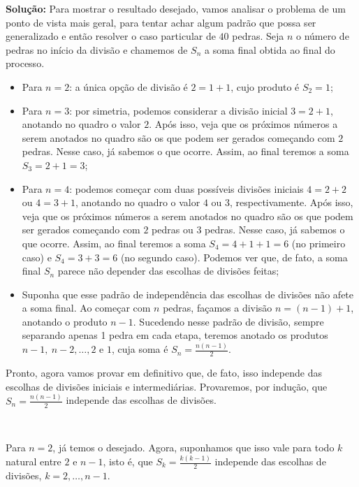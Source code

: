 \documentclass{hipatia}
\begin{document}
\noindent \textbf{Solução:}
Para mostrar o resultado desejado, vamos analisar o problema de um ponto de vista mais geral, para tentar achar algum padrão que possa ser generalizado e então resolver o caso particular de $40$ pedras. Seja $n$ o número de pedras no início da divisão e chamemos de $S_n$ a soma final obtida ao final do processo. 

\begin{itemize}

\item Para $n = 2$: a única opção de divisão é $2 = 1 + 1$, cujo produto é $S_2 = 1$;

\item Para $n = 3$: por simetria, podemos considerar a divisão inicial $3 = 2 + 1$, anotando no quadro o valor $2$. Após isso, veja que os próximos números a serem anotados no quadro são os que podem ser gerados começando com $2$ pedras. Nesse caso, já sabemos o que ocorre. Assim, ao final teremos a soma $S_3 = 2 + 1 = 3$;

\item Para $n = 4$: podemos começar com duas possíveis divisões iniciais $4 = 2 + 2$ ou $4 = 3 + 1$, anotando no quadro o valor $4$ ou $3$, respectivamente. Após isso, veja que os próximos números a serem anotados no quadro são os que podem ser gerados começando com $2$ pedras ou $3$ pedras. Nesse caso, já sabemos o que ocorre. Assim, ao final teremos a soma $S_4 = 4 + 1 + 1 = 6$ (no primeiro caso) e $S_4 = 3 + 3 = 6$ (no segundo caso). Podemos ver que, de fato, a soma final $S_n$ parece não depender das escolhas de divisões feitas;

\item Suponha que esse padrão de independência das escolhas de divisões não afete a soma final. Ao começar com $n$ pedras, façamos a divisão $n = (n - 1) + 1$, anotando o produto $n - 1$. Sucedendo nesse padrão de divisão, sempre separando apenas 1 pedra em cada etapa, teremos anotado os produtos $n - 1, \ n - 2, \ldots, 2$ e $1$, cuja soma é $S_n = \frac{n(n-1)}{2}$.
\end{itemize}

Pronto, agora vamos provar em definitivo que, de fato, isso independe das escolhas de divisões iniciais e intermediárias. Provaremos, por indução, que $S_n = \frac{n(n-1)}{2}$ independe das escolhas de divisões. 

\ 

Para $n = 2$, já temos o desejado. Agora, suponhamos que isso vale para todo $k$ natural entre $2$ e $n - 1$, isto é, que $S_k = \frac{k(k-1)}{2}$ independe das escolhas de divisões, $k = 2, \ldots, n - 1$. 
\end{document}

